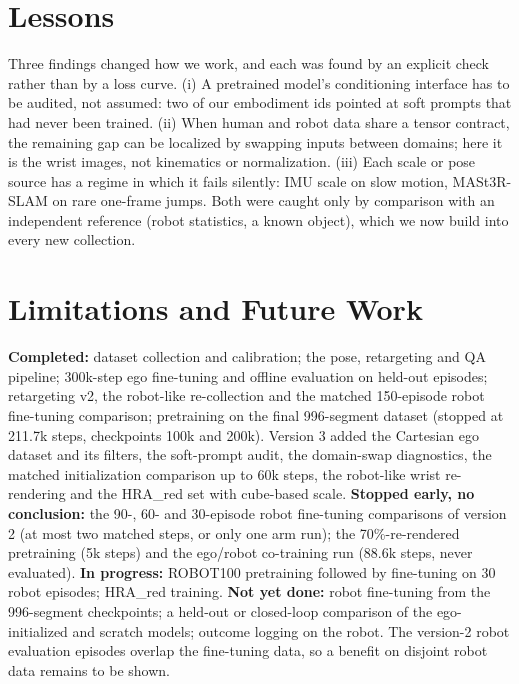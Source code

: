 \documentclass[conference,10pt]{IEEEtran}
\begin{document}
\section{Lessons}\label{sec:lessons}
Three findings changed how we work, and each was found by an explicit check rather than by a loss curve. (i) A pretrained
model's conditioning interface has to be audited, not assumed: two of our embodiment ids pointed at soft prompts that had never
been trained. (ii) When human and robot data share a tensor contract, the remaining gap can be localized by swapping inputs
between domains; here it is the wrist images, not kinematics or normalization. (iii) Each scale or pose source has a regime in
which it fails silently: IMU scale on slow motion, MASt3R-SLAM on rare one-frame jumps. Both were caught only by comparison with an
independent reference (robot statistics, a known object), which we now build into every new collection.

\section{Limitations and Future Work}\label{sec:lim}
\textbf{Completed:} dataset collection and calibration; the pose, retargeting and QA pipeline; 300k-step ego fine-tuning and
offline evaluation on held-out episodes; retargeting v2, the robot-like re-collection and the matched 150-episode robot
fine-tuning comparison; pretraining on the final 996-segment dataset (stopped at 211.7k steps, checkpoints 100k and 200k).
Version 3 added the Cartesian ego dataset and its filters, the soft-prompt audit, the domain-swap diagnostics, the matched
initialization comparison up to 60k steps, the robot-like wrist re-rendering and the HRA\_red set with cube-based scale.
\textbf{Stopped early, no conclusion:} the 90-, 60- and 30-episode robot fine-tuning comparisons of version 2 (at most two
matched steps, or only one arm run); the 70\%-re-rendered pretraining (5k steps) and the ego/robot co-training run (88.6k
steps, never evaluated). \textbf{In progress:} ROBOT100 pretraining followed by fine-tuning on 30 robot episodes; HRA\_red
training. \textbf{Not yet done:} robot fine-tuning from the 996-segment checkpoints; a held-out or closed-loop comparison of
the ego-initialized and scratch models; outcome logging on the robot. The version-2 robot evaluation episodes overlap the
fine-tuning data, so a benefit on disjoint robot data remains to be shown.
\end{document}
